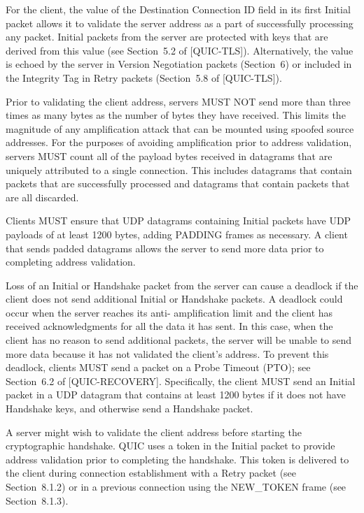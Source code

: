 \documentclass{article}
\begin{document}
For the client, the value of the Destination Connection ID field in its first Initial packet allows it to validate the server address as a part of successfully processing any packet.  Initial packets from the server are protected with keys that are derived from this value (see Section~5.2 of [QUIC-TLS]).  Alternatively, the value is echoed by the server in Version Negotiation packets (Section~6) or included in the Integrity Tag in Retry packets (Section~5.8 of [QUIC-TLS]).

Prior to validating the client address, servers MUST NOT send more than three times as many bytes as the number of bytes they have received.  This limits the magnitude of any amplification attack that can be mounted using spoofed source addresses.  For the purposes of avoiding amplification prior to address validation, servers MUST count all of the payload bytes received in datagrams that are uniquely attributed to a single connection.  This includes datagrams that contain packets that are successfully processed and datagrams that contain packets that are all discarded.

Clients MUST ensure that UDP datagrams containing Initial packets have UDP payloads of at least 1200 bytes, adding PADDING frames as necessary.  A client that sends padded datagrams allows the server to send more data prior to completing address validation.

Loss of an Initial or Handshake packet from the server can cause a deadlock if the client does not send additional Initial or Handshake packets.  A deadlock could occur when the server reaches its anti- amplification limit and the client has received acknowledgments for all the data it has sent.  In this case, when the client has no reason to send additional packets, the server will be unable to send more data because it has not validated the client's address.  To prevent this deadlock, clients MUST send a packet on a Probe Timeout (PTO); see Section~6.2 of [QUIC-RECOVERY].  Specifically, the client MUST send an Initial packet in a UDP datagram that contains at least 1200 bytes if it does not have Handshake keys, and otherwise send a Handshake packet.

A server might wish to validate the client address before starting the cryptographic handshake.  QUIC uses a token in the Initial packet to provide address validation prior to completing the handshake. This token is delivered to the client during connection establishment with a Retry packet (see Section~8.1.2) or in a previous connection using the NEW\_TOKEN frame (see Section~8.1.3).
\end{document}
